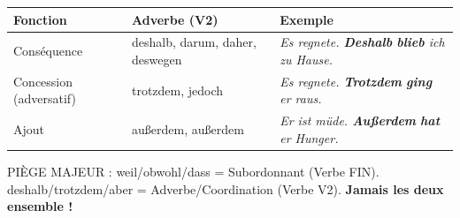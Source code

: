 \documentclass[11pt]{article}
\newcommand{\cle}[1]{{\popxbold\color{popdark}#1}}
\newcommand{\all}[1]{\ifmmode\text{\textit{#1}}\else\begingroup\selectlanguage{ngerman}\itshape #1\endgroup\fi}
\begin{document}
\begin{definition}
\begin{center}
\begin{tabular}{|l|l|l|}\hline
\rowcolor{popblueL} \textbf{Fonction} & \textbf{Adverbe (V2)} & \textbf{Exemple} \\ \hline
Conséquence & \cle{deshalb, darum, daher, deswegen} & \all{Es regnete. \textbf{Deshalb} \textbf{blieb} ich zu Hause.} \\ \hline
Concession (adversatif) & \cle{trotzdem, jedoch} & \all{Es regnete. \textbf{Trotzdem} \textbf{ging} er raus.} \\ \hline
Ajout & \cle{außerdem, außerdem} & \all{Er ist müde. \textbf{Außerdem} \textbf{hat} er Hunger.} \\ \hline
\end{tabular}
\end{center}
\cle{PIÈGE MAJEUR :} \cle{weil/obwohl/dass} = Subordonnant (Verbe FIN). \cle{deshalb/trotzdem/aber} = Adverbe/Coordination (Verbe V2). \textbf{Jamais les deux ensemble !}
\end{definition}
\end{document}
